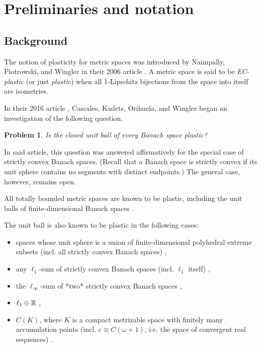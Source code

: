 \documentclass{amsart}
\newtheorem*{prob*}{Problem}
\begin{document}
\section{Preliminaries and notation}

\subsection{Background}

The notion of plasticity for metric spaces was introduced by Naimpally, Piotrowski, and Wingler in their 2006 article \cite{naimpally:2006}.
A metric space is said to be \textit{EC-plastic} (or just \textit{plastic}) when
all 1-Lipschitz bijections from the space into itself are isometries.

In their 2016 article \cite{cascales:2016}, Cascales, Kadets, Orihuela, and Wingler began an investigation
of the following question.

\begin{prob*}
    Is the closed unit ball of every Banach space plastic?
\end{prob*}

In said article, this question was answered affirmatively for the special case of strictly convex Banach spaces. (Recall that a Banach
space is strictly convex if its
unit sphere contains no segments with distinct
endpoints.) The general case, however, remains open.

All totally bounded metric spaces are known to be plastic, including the unit balls of finite-dimensional Banach spaces \cite{naimpally:2006}.

The unit ball is also known to be plastic
in the following cases:
\begin{itemize}
    \item spaces whose unit sphere is a union of finite-dimensional polyhedral extreme subsets (incl. all strictly convex Banach spaces) \cite{angosto:2019,cascales:2016},
    \item any $\ell_1$-sum of strictly convex Banach spaces 
    (incl. $\ell_1$ itself) \cite{kadets_zavarzina:2016,kadets_zavarzina:2018},
    \item the $\ell_\infty$-sum of *two* strictly convex Banach spaces \cite{haller:2022},
    \item $\ell_1 \oplus \mathbb{R}$ \cite{haller:2022},
    \item $C(K)$, where $K$ is a compact metrizable space with finitely many
    accumulation points (incl. $c \cong C(\omega+1)$, i.e. the space of convergent real sequences)
    \cite{fakhoury:2024,leo:2022}.
\end{itemize}
\end{document}
